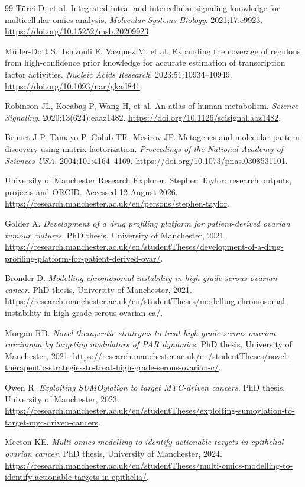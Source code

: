 \begin{thebibliography}{99}
Türei D, et al. Integrated intra- and intercellular signaling knowledge for
multicellular omics analysis. \emph{Molecular Systems Biology}. 2021;17:e9923.
\url{https://doi.org/10.15252/msb.20209923}.

Müller-Dott S, Tsirvouli E, Vazquez M, et al. Expanding the coverage of
regulons from high-confidence prior knowledge for accurate estimation of
transcription factor activities. \emph{Nucleic Acids Research}.
2023;51:10934--10949. \url{https://doi.org/10.1093/nar/gkad841}.

Robinson JL, Kocabaş P, Wang H, et al. An atlas of human metabolism.
\emph{Science Signaling}. 2020;13(624):eaaz1482.
\url{https://doi.org/10.1126/scisignal.aaz1482}.

Brunet J-P, Tamayo P, Golub TR, Mesirov JP. Metagenes and molecular pattern
discovery using matrix factorization. \emph{Proceedings of the National
Academy of Sciences USA}. 2004;101:4164--4169.
\url{https://doi.org/10.1073/pnas.0308531101}.

University of Manchester Research Explorer. Stephen Taylor: research outputs,
projects and ORCID. Accessed 12 August 2026.
\url{https://research.manchester.ac.uk/en/persons/stephen-taylor}.

Golder A. \emph{Development of a drug profiling platform for patient-derived
ovarian tumour cultures}. PhD thesis, University of Manchester, 2021.
\url{https://research.manchester.ac.uk/en/studentTheses/development-of-a-drug-profiling-platform-for-patient-derived-ovar/}.

Bronder D. \emph{Modelling chromosomal instability in high-grade serous
ovarian cancer}. PhD thesis, University of Manchester, 2021.
\url{https://research.manchester.ac.uk/en/studentTheses/modelling-chromosomal-instability-in-high-grade-serous-ovarian-ca/}.

Morgan RD. \emph{Novel therapeutic strategies to treat high-grade serous
ovarian carcinoma by targeting modulators of PAR dynamics}. PhD thesis,
University of Manchester, 2021.
\url{https://research.manchester.ac.uk/en/studentTheses/novel-therapeutic-strategies-to-treat-high-grade-serous-ovarian-c/}.

Owen R. \emph{Exploiting SUMOylation to target MYC-driven cancers}. PhD thesis,
University of Manchester, 2023.
\url{https://research.manchester.ac.uk/en/studentTheses/exploiting-sumoylation-to-target-myc-driven-cancers}.

Meeson KE. \emph{Multi-omics modelling to identify actionable targets in
epithelial ovarian cancer}. PhD thesis, University of Manchester, 2024.
\url{https://research.manchester.ac.uk/en/studentTheses/multi-omics-modelling-to-identify-actionable-targets-in-epithelia/}.

\end{thebibliography}
